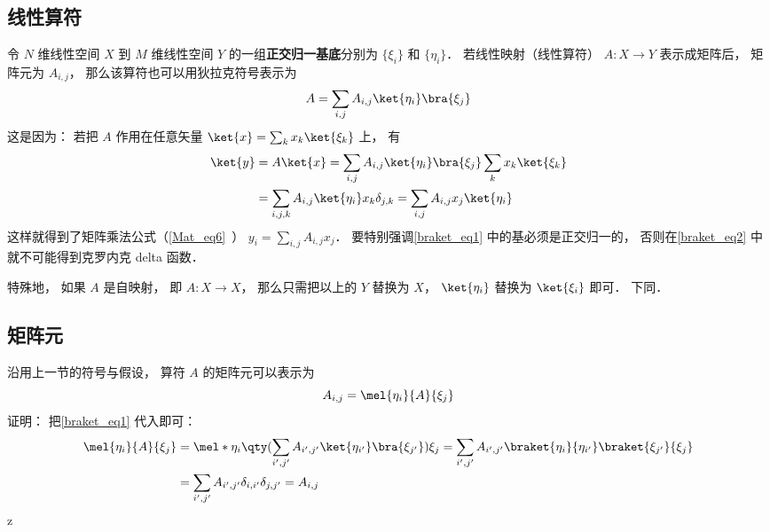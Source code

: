 \subsection{线性算符}
令 $N$ 维线性空间 $X$ 到 $M$ 维线性空间 $Y$ 的一组\textbf{正交归一基底}分别为 $\{\xi_i\}$ 和 $\{\eta_i\}$． 若线性映射（线性算符） $A:X\to Y$ 表示成矩阵后， 矩阵元为 $A_{i,j}$， 那么该算符也可以用狄拉克符号表示为
\begin{equation}\label{braket_eq1}
A = \sum_{i,j} A_{i,j} \ket{\eta_i}\bra{\xi_j}
\end{equation}
这是因为： 若把 $A$ 作用在任意矢量 $\ket{x} = \sum_k x_k\ket{\xi_k}$ 上， 有
\begin{equation}\label{braket_eq2}
\begin{aligned}
\ket{y} &= A\ket{x} = \sum_{i,j} A_{i,j} \ket{\eta_i}\bra{\xi_j} \sum_k x_k\ket{\xi_k}\\
&= \sum_{i,j, k} A_{i,j} \ket{\eta_i} x_k \delta_{j,k}
= \sum_{i,j} A_{i,j} x_j \ket{\eta_i}
\end{aligned}
\end{equation}
这样就得到了矩阵乘法公式（\autoref{Mat_eq6}~） $y_i = \sum_{i,j} A_{i,j} x_j$． 要特别强调\autoref{braket_eq1} 中的基必须是正交归一的， 否则在\autoref{braket_eq2} 中就不可能得到克罗内克 delta 函数．

特殊地， 如果 $A$ 是自映射， 即 $A:X\to X$， 那么只需把以上的 $Y$ 替换为 $X$， $\ket{\eta_i}$ 替换为 $\ket{\xi_i}$ 即可． 下同．

\subsection{矩阵元}
沿用上一节的符号与假设， 算符 $A$ 的矩阵元可以表示为
\begin{equation}
A_{i,j} = \mel{\eta_i}{A}{\xi_j}
\end{equation}
证明： 把\autoref{braket_eq1} 代入即可：
\begin{equation}
\begin{aligned}
\mel{\eta_i}{A}{\xi_j} &= \mel*{\eta_i}{\qty(\sum_{i',j'} A_{i',j'} \ket{\eta_{i'}}\bra{\xi_{j'}})}{\xi_j}
= \sum_{i',j'} A_{i',j'} \braket{\eta_i}{\eta_{i'}}\braket{\xi_{j'}}{\xi_j}\\
&= \sum_{i',j'} A_{i',j'} \delta_{i,i'}\delta_{j,j'}
= A_{i,j}
\end{aligned}
\end{equation}
z
